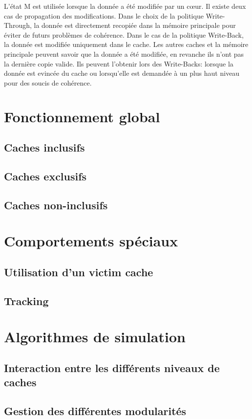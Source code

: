 \documentclass[a4paper]{article}
\begin{document}
\indent L'état M est utilisée lorsque la donnée a été modifiée par un c{\oe}ur. Il existe deux cas de propagation des modifications. Dans le choix de la politique Write-Through, la donnée est directement recopiée dans la mémoire principale pour éviter de futurs problèmes de cohérence. Dans le cas de la politique Write-Back, la donnée est modifiée uniquement dans le cache. Les autres caches et la mémoire principale peuvent savoir que la donnée a été modifiée, en revanche ils n'ont pas la dernière copie valide. Ils peuvent l'obtenir lors des Write-Backs: lorsque la donnée est evincée du cache ou lorsqu'elle est demandée à un plus haut niveau pour des soucis de cohérence.

\newpage
\section{Fonctionnement global}

\subsection{Caches inclusifs}

\subsection{Caches exclusifs}

\subsection{Caches non-inclusifs}


\newpage
\section{Comportements spéciaux}

\subsection{Utilisation d'un victim cache}

\subsection{Tracking}

\newpage
\section{Algorithmes de simulation}

\subsection{Interaction entre les différents niveaux de caches}

\subsection{Gestion des différentes modularités}

\newpage
\nocite{*}


\end{document}
